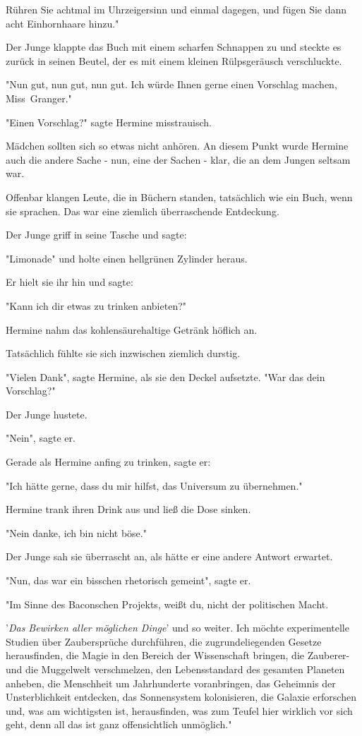 {Rühren Sie achtmal im Uhrzeigersinn und einmal dagegen, und fügen Sie dann acht Einhornhaare hinzu."

Der Junge klappte das Buch mit einem scharfen Schnappen zu und steckte es zurück in seinen Beutel, der es mit einem kleinen Rülpsgeräusch verschluckte.

"Nun gut, nun gut, nun gut. Ich würde Ihnen gerne einen Vorschlag machen, Miss~Granger."

"Einen Vorschlag?" sagte Hermine misstrauisch.

Mädchen sollten sich so etwas nicht anhören. An diesem Punkt wurde Hermine auch die andere Sache - nun, eine der Sachen - klar, die an dem Jungen seltsam war.

Offenbar klangen Leute, die in Büchern standen, tatsächlich wie ein Buch, wenn sie sprachen. Das war eine ziemlich überraschende Entdeckung.

Der Junge griff in seine Tasche und sagte:

"Limonade" und holte einen hellgrünen Zylinder heraus.

Er hielt sie ihr hin und sagte:

"Kann ich dir etwas zu trinken anbieten?"

Hermine nahm das kohlensäurehaltige Getränk höflich an.

Tatsächlich fühlte sie sich inzwischen ziemlich durstig.

"Vielen Dank", sagte Hermine, als sie den Deckel aufsetzte. "War das dein Vorschlag?"

Der Junge hustete.

"Nein", sagte er.

Gerade als Hermine anfing zu trinken, sagte er:

"Ich hätte gerne, dass du mir hilfst, das Universum zu übernehmen."

Hermine trank ihren Drink aus und ließ die Dose sinken.

"Nein danke, ich bin nicht böse."

Der Junge sah sie überrascht an, als hätte er eine andere Antwort erwartet.

"Nun, das war ein bisschen rhetorisch gemeint", sagte er.

"Im Sinne des Baconschen Projekts, weißt du, nicht der politischen Macht.

'\emph{Das Bewirken aller möglichen Dinge}' und so weiter. Ich möchte experimentelle Studien über Zaubersprüche durchführen, die zugrundeliegenden Gesetze herausfinden, die Magie in den Bereich der Wissenschaft bringen, die Zauberer- und die Muggelwelt verschmelzen, den Lebensstandard des gesamten Planeten anheben, die Menschheit um Jahrhunderte voranbringen, das Geheimnis der Unsterblichkeit entdecken, das Sonnensystem kolonisieren, die Galaxie erforschen und, was am wichtigsten ist, herausfinden, was zum Teufel hier wirklich vor sich geht, denn all das ist ganz offensichtlich unmöglich."

}
